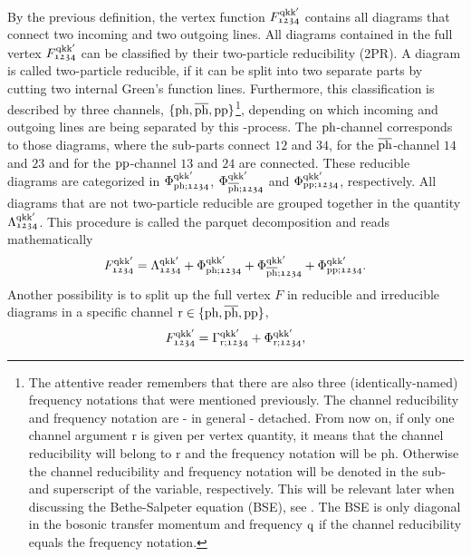 \documentclass[../../main.tex]{subfiles}
\begin{document}
By the previous definition, the vertex function $F_{\mathfrak{1234}}^{\text{q}\text{k}\text{k}'}$ contains all diagrams that connect two incoming and two outgoing lines. All diagrams contained in the full vertex $F_{\mathfrak{1234}}^{\text{q}\text{k}\text{k}'}$ can be classified by their two-particle reducibility (2PR). A diagram is called two-particle reducible, if it can be split into two separate parts by cutting two internal Green's function lines. Furthermore, this classification is described by three channels, $\{\text{ph},\overline{\text{ph}},\text{pp}\}$\footnote{The attentive reader remembers that there are also three (identically-named) frequency notations that were mentioned previously. The channel reducibility and frequency notation are - in general - detached. From now on, if only one channel argument r is given per vertex quantity, it means that the channel reducibility will belong to r and the frequency notation will be ph. Otherwise the channel reducibility and frequency notation will be denoted in the sub- and superscript of the variable, respectively. This will be relevant later when discussing the Bethe-Salpeter equation (BSE), see . The BSE is only diagonal in the bosonic transfer momentum and frequency $\text{q}$ if the channel reducibility equals the frequency notation.}, depending on which incoming and outgoing lines are being separated by this -process. The $\text{ph}$-channel corresponds to those diagrams, where the sub-parts connect $\mathfrak{12}$ and $\mathfrak{34}$, for the $\overline{\text{ph}}$-channel $\mathfrak{14}$ and $\mathfrak{23}$ and for the $\text{pp}$-channel $\mathfrak{13}$ and $\mathfrak{24}$ are connected. These reducible diagrams are categorized in $\Phi_{\text{ph};\mathfrak{1234}}^{\text{q}\text{k}\text{k}'}$, $\Phi_{\overline{\text{ph}};\mathfrak{1234}}^{\text{q}\text{k}\text{k}'}$ and $\Phi_{\text{pp};\mathfrak{1234}}^{\text{q}\text{k}\text{k}'}$, respectively. All diagrams that are not two-particle reducible are grouped together in the quantity $\Lambda_{\mathfrak{1234}}^{\text{q}\text{k}\text{k}'}$. This procedure is called the parquet decomposition and reads mathematically
\begin{align}\label{eq:parquet_decomposition}
	F_{\mathfrak{1234}}^{\text{q}\text{k}\text{k}'}=\Lambda_{\mathfrak{1234}}^{\text{q}\text{k}\text{k}'}+\Phi_{\text{ph};\mathfrak{1234}}^{\text{q}\text{k}\text{k}'}+\Phi_{\overline{\text{ph}};\mathfrak{1234}}^{\text{q}\text{k}\text{k}'}+\Phi_{\text{pp};\mathfrak{1234}}^{\text{q}\text{k}\text{k}'}.
\end{align}
Another possibility is to split up the full vertex $F$ in reducible and irreducible diagrams in a specific channel $\text{r}\in\{\text{ph},\overline{\text{ph}},\text{pp}\}$,
\begin{align}\label{eq:full_vertex_gamma_phi}
	F_{\mathfrak{1234}}^{\text{q}\text{k}\text{k}'}=\Gamma_{\text{r};\mathfrak{1234}}^{\text{q}\text{k}\text{k}'}+\Phi_{\text{r};\mathfrak{1234}}^{\text{q}\text{k}\text{k}'},
\end{align}
\end{document}
